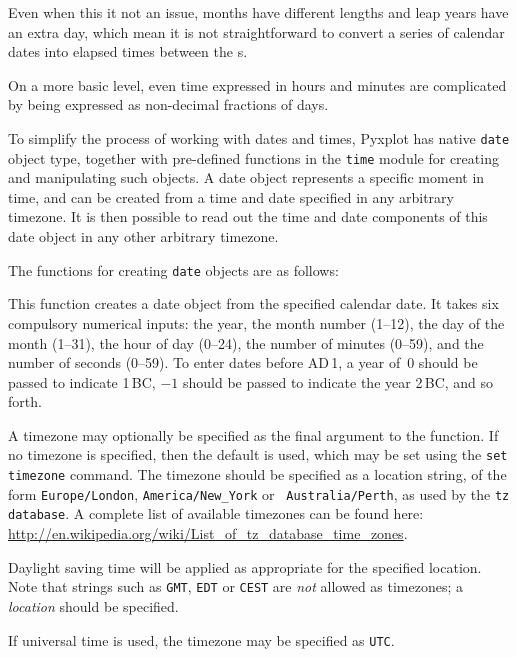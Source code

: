 Even when this it not an issue, months have different lengths and leap years
have an extra day, which mean it is not straightforward to convert a series of
calendar dates into elapsed times between the \datapoint s.

On a more basic level, even time expressed in hours and minutes are complicated
by being expressed as non-decimal fractions of days.

To simplify the process of working with dates and times, Pyxplot has native
{\tt date} object type, together with pre-defined functions in the {\tt time}
module for creating and manipulating such objects.  A date object represents a
specific moment in time, and can be created from a time and date specified in
any arbitrary timezone. It is then possible to read out the time and date
components of this date object in any other arbitrary timezone.

The functions for creating {\tt date} objects are as follows:

\vspace{2mm}\vspace{2mm}

\noindent This function creates a date object from the specified calendar date.
It takes six compulsory numerical inputs: the year, the month number (1--12),
the day of the month (1--31), the hour of day (0--24), the number of minutes
(0--59), and the number of seconds (0--59). To enter dates before
{\footnotesize AD}\,1, a year of~$0$ should be passed to indicate
1\,{\footnotesize BC}, $-1$ should be passed to indicate the year
2\,{\footnotesize BC}, and so forth.

A timezone may optionally be specified as the final argument to the function.
If no timezone is specified, then the default is used, which may be set using
the {\tt set timezone} command. The timezone should be specified as a location string,
of the form {\tt Europe/London}, {\tt America/New\_York} or {\tt
Australia/Perth}, as used by the {\tt tz database}. A complete list of
available timezones can be found here:
\url{http://en.wikipedia.org/wiki/List_of_tz_database_time_zones}.

Daylight saving time will be applied as appropriate for the specified location.
Note that strings such as {\tt GMT}, {\tt EDT} or {\tt CEST} are {\it not}
allowed as timezones; a {\it location} should be specified.

If universal time is used, the timezone may be specified as {\tt UTC}.

